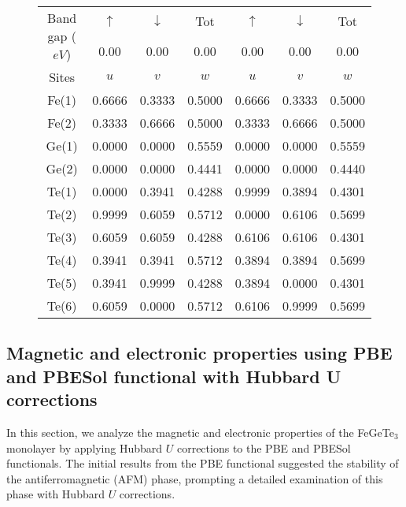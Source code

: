 \begin{figure}[H]
\begin{minipage}[b]{.55\linewidth}
{\begin{tabular}{ccccccc}
				\midrule
				\multirow{2}{*}{Band gap (\(eV\))} & $\uparrow$ & $\downarrow$ & Tot  &  $\uparrow$ & $\downarrow$ & Tot  \\
				&  0.00  & 0.00  &  0.00 &  0.00  &  0.00  & 0.00  \\ 
				\midrule                                                              
				Sites & \(u\) & \(v\) & \(w\) & \(u\) & \(v\) & \(w\) \\
				Fe(1) & 0.6666 & 0.3333 & 0.5000  & 0.6666 & 0.3333 & 0.5000  \\
				Fe(2) & 0.3333 & 0.6666 & 0.5000  & 0.3333 & 0.6666 & 0.5000  \\
				Ge(1) & 0.0000 & 0.0000 & 0.5559  & 0.0000 & 0.0000 & 0.5559  \\ 
				Ge(2) & 0.0000 & 0.0000 & 0.4441  & 0.0000 & 0.0000 & 0.4440  \\
				Te(1) & 0.0000 & 0.3941 & 0.4288  & 0.9999 & 0.3894 & 0.4301  \\
				Te(2) & 0.9999 & 0.6059 & 0.5712  & 0.0000 & 0.6106 & 0.5699  \\
				Te(3) & 0.6059 & 0.6059 & 0.4288  & 0.6106 & 0.6106 & 0.4301  \\
				Te(4) & 0.3941 & 0.3941 & 0.5712  & 0.3894 & 0.3894 & 0.5699  \\
				Te(5) & 0.3941 & 0.9999 & 0.4288  & 0.3894 & 0.0000 & 0.4301  \\
				Te(6) & 0.6059 & 0.0000 & 0.5712  & 0.6106 & 0.9999 & 0.5699  \\
				\bottomrule
				\bottomrule
			\end{tabular}
		}
	\end{minipage}
	\label{fig:4.17}
\end{figure}

\subsection{Magnetic and electronic properties using PBE and PBESol functional with Hubbard U corrections}

In this section, we analyze the magnetic and electronic properties of the FeGeTe$_3$ monolayer by applying Hubbard $U$ corrections to the PBE and PBESol functionals. The initial results from the PBE functional suggested the stability of the antiferromagnetic (AFM) phase, prompting a detailed examination of this phase with Hubbard $U$ corrections.

